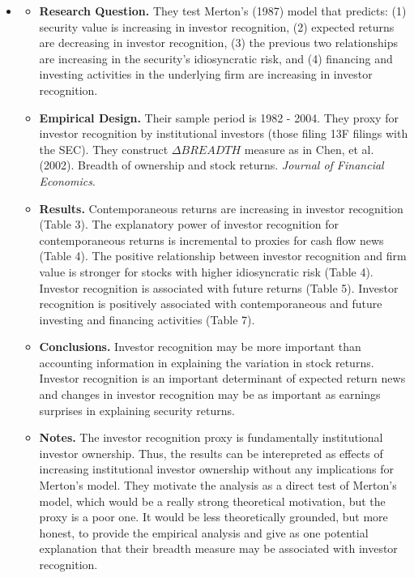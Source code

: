 \documentclass[12pt, letterpaper]{article}
\begin{document}
\begin{itemize}
\item \cite{lehavysloan2008}
    \begin{itemize}
    \item \textbf{Research Question.} They test Merton's (1987) model that predicts: (1) security 
value is increasing in investor recognition, (2) expected returns are decreasing in investor 
recognition, (3) the previous two relationships are increasing in the security's idiosyncratic 
risk, and (4) financing and investing activities in the underlying firm are increasing in investor 
recognition.
    
    \item \textbf{Empirical Design.} Their sample period is 1982 - 2004. They proxy for investor 
recognition by institutional investors (those filing 13F filings with the SEC). They construct 
$\Delta BREADTH$ measure as in Chen, et al. (2002). Breadth of ownership and stock returns. 
\emph{Journal of Financial Economics}.
    
    \item \textbf{Results.} Contemporaneous returns are increasing in investor recognition (Table 
3). The explanatory power of investor recognition for contemporaneous returns is incremental to 
proxies for cash flow news (Table 4). The positive relationship between investor recognition and 
firm value is stronger for stocks with higher idiosyncratic risk (Table 4). Investor recognition is 
associated with future returns (Table 5). Investor recognition is positively associated with 
contemporaneous and future investing and financing activities (Table 7).
    
    \item \textbf{Conclusions.} Investor recognition may be more important than accounting 
information in explaining the variation in stock returns. Investor recognition is an important 
determinant of expected return news and changes in investor recognition may be as important as 
earnings surprises in explaining security returns.
    
    \item \textbf{Notes.} The investor recognition proxy is fundamentally institutional investor 
ownership. Thus, the results can be interepreted as effects of increasing institutional investor 
ownership without any implications for Merton's model. They motivate the analysis as a direct test 
of Merton's model, which would be a really strong theoretical motivation, but the proxy is a poor
one. It would be less theoretically grounded, but more honest, to provide the empirical analysis and
give as one potential explanation that their breadth measure may be associated with investor 
recognition. 


\end{itemize}
\end{itemize}
\end{document}
